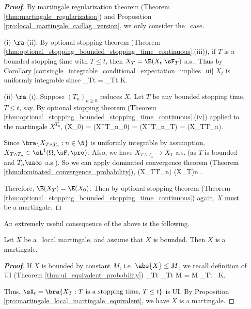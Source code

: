 \begin{proof}[\bf Proof]
By martingale regularization theorem (Theorem \ref{thm:martingale_regularization}) and Proposition \ref{pro:local_martingale_cadlag_version}, we only consider the \cadlag\ case.

(i) $\ra$ (ii). By optional stopping theorem (Theorem \ref{thm:optional_stopping_bounded_stopping_time_continuous}.(iii)), if $T$ is a bounded stopping time with $T \leq t$, then $X_T =
\E(X_t|\sF_T)$ a.s.. Thus by Corollary \ref{cor:single_integrable_conditional_expectation_implies_ui} $X_t$ is uniformly integrable since
\be
\sup_{T\leq t}\E{} = \sup_{T\leq t}\E{}  \quad{}K\to \infty.
\ee

(ii) $\ra$ (i). Suppose $(T_n)_{n\geq 0}$ reduces $X$. Let $T$ be any bounded stopping time, $T \leq t$, say. By optional stopping theorem (Theorem
\ref{thm:optional_stopping_bounded_stopping_time_continuous}.(iv)) applied to the martingale $X^{T_n}$,
\be
\E(X_0) = \E(X^{T_n}_0) = \E(X^{T_n}_T) = \E(X_{T\land T_n}).
\ee

Since $\bra{X_{T\land T_n}:n \in \N}$ is uniformly integrable by assumption, $X_{T\land T_n} \in \sL^1(\Omega,\sF,\pro)$. Also, we have $X_{T\land T_n} \to X_T$ a.s. (as $T$ is bounded and $T_n\ua
\infty$ a.s.). So we can apply dominated convergence theorem (Theorem \ref{thm:dominated_convergence_probability}),
\be
\E(X_{T\land T_n}) \to \E(X_T)\quad {}n \to \infty.
\ee

Therefore, $\E(X_T) = \E(X_0)$. Then by optional stopping theorem (Theorem \ref{thm:optional_stopping_bounded_stopping_time_continuous}) again, $X$ must be a martingale.
\end{proof}

An extremely useful consequence of the above is the following.

\begin{corollary}\label{cor:local_martingale_bounded_martingale}
Let $X$ be a \cadlag\ local martingale, and assume that $X$ is bounded. Then $X$ is a martingale.
\end{corollary}

\begin{proof}[\bf Proof]
If $X$ is bounded by constant $M$, i.e. $\abs{X}\leq M$, we recall definition of UI (Theorem \ref{thm:ui_equivalent_probability})
\be
\sup_{T\leq t} \E{} \leq \sup_{T\leq t} M \E{} = M \sup_{T\leq t} \pro{}  \ K\to \infty.
\ee

Thus, $\sX_t = \bra{X_T : T \text{ is a stopping time, }T \leq t}$ is UI. By Proposition \ref{pro:martingale_local_martingale_equivalent}, we have $X$ is a martingale.
\end{proof}



